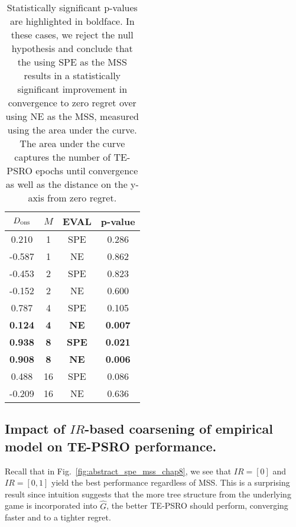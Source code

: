 \begin{table}[ht!]
    \centering
    \begin{tabular}{|c|c|c|c|}
    \hline
        $D_{\textsc{obs}}$ & $M$ & EVAL & p-value \\
    \hline
        0.210 & 1 & SPE & 0.286 \\
        -0.587 & 1 & NE & 0.862 \\
        -0.453 & 2 & SPE & 0.823 \\
        -0.152 & 2 & NE & 0.600 \\
        0.787 & 4 & SPE & 0.105 \\
        \textbf{0.124} & \textbf{4} & \textbf{NE} & \textbf{0.007} \\
        \textbf{0.938} & \textbf{8} & \textbf{SPE} & \textbf{0.021} \\
        \textbf{0.908} & \textbf{8} & \textbf{NE} & \textbf{0.006} \\
        0.488 & 16 & SPE & 0.086 \\
        -0.209 & 16 & NE & 0.636 \\
    \hline
    \end{tabular}
    \vspace{1em}
    \caption{Statistically significant p-values are highlighted in boldface. In these cases, we reject the null hypothesis and conclude that the using SPE as the MSS results in a statistically significant improvement in convergence to zero regret over using NE as the MSS, measured using the area under the curve. The area under the curve captures the number of TE-PSRO epochs until convergence as well as the distance on the y-axis from zero regret.}
    \label{tab:regret_perm_k5}
\end{table}

\subsection{Impact of $IR$-based coarsening of \gengoof empirical model on TE-PSRO performance.}
\label{app:IR_gengoof}

Recall that in Fig.~\ref{fig:abstract_spe_mss_chap8}, we see that $IR = [0]$ and $IR = [0, 1]$ yield the best performance regardless of MSS. This is a surprising result since intuition suggests that the more tree structure from the underlying game is incorporated into $\hat{G}$, the better TE-PSRO should perform, converging faster and to a tighter regret. 

